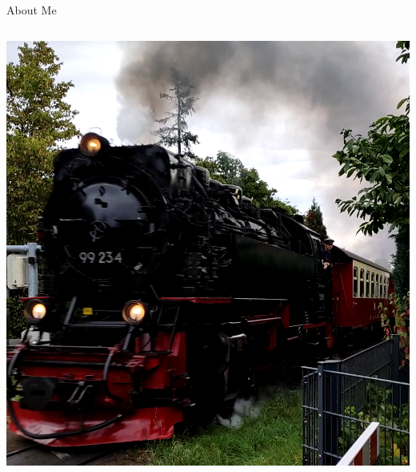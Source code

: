 \documentclass[usenames,dvipsnames,aspectratio=169]{beamer}
\begin{document}
\begin{frame}{About Me}
\begin{columns}
			\begin{column}{0.45\textwidth}
				\begin{tcolorbox}[colback=white, colframe=ElixirPurple, arc=3mm, boxrule=0mm, height=0.8\textheight, valign=center, title=Privat Live]
					\includegraphics[width=\tcbtextwidth,   keepaspectratio]{pictures/vlcsnap-2024-01-31-23h37m06s479.png}
				\end{tcolorbox}
			\end{column}
			
		\end{columns}
	\end{frame}
	
\end{document}
